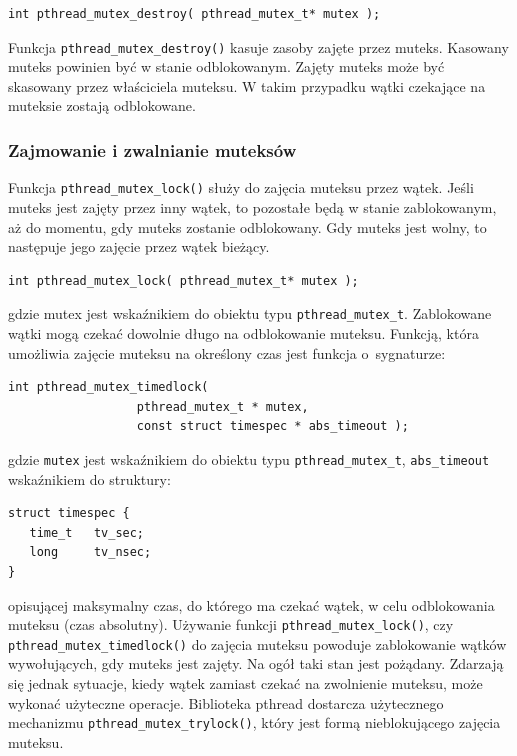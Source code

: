 \begin{lstlisting}[style=MyCStyle]
int pthread_mutex_destroy( pthread_mutex_t* mutex );
\end{lstlisting}

Funkcja \lstinline[style=MyCStyle]{pthread_mutex_destroy()} kasuje zasoby zajęte przez muteks. Kasowany muteks powinien być w stanie odblokowanym. Zajęty muteks może być skasowany przez właściciela muteksu. W takim przypadku wątki czekające na muteksie zostają odblokowane. 

\subsubsection{Zajmowanie i zwalnianie muteksów}

Funkcja  \lstinline[style=MyCStyle]{pthread_mutex_lock()} służy do zajęcia muteksu przez wątek. Jeśli muteks jest zajęty przez inny wątek, to pozostałe będą w stanie zablokowanym, aż do momentu, gdy muteks zostanie odblokowany. Gdy muteks jest wolny, to następuje jego zajęcie przez wątek bieżący.

\begin{lstlisting}[style=MyCStyle]
int pthread_mutex_lock( pthread_mutex_t* mutex );
\end{lstlisting}

gdzie mutex jest wskaźnikiem do obiektu typu \lstinline[style=MyCStyle]{pthread_mutex_t}. Zablokowane wątki mogą czekać dowolnie długo na odblokowanie muteksu. Funkcją, która umożliwia zajęcie muteksu na określony czas jest funkcja o~sygnaturze:

\begin{lstlisting}[style=MyCStyle]
int pthread_mutex_timedlock( 
                  pthread_mutex_t * mutex,
                  const struct timespec * abs_timeout );
\end{lstlisting}

gdzie \lstinline[style=MyCStyle]{mutex} jest wskaźnikiem do obiektu typu \lstinline[style=MyCStyle]{pthread_mutex_t}, \lstinline[style=MyCStyle]{abs_timeout} wskaźnikiem do struktury:

\begin{lstlisting}[style=MyCStyle]
struct timespec {
   time_t   tv_sec;
   long     tv_nsec;
}
\end{lstlisting}

opisującej maksymalny czas, do którego ma czekać wątek, w celu odblokowania muteksu (czas absolutny). 
Używanie funkcji \lstinline[style=MyCStyle]{pthread_mutex_lock()}, czy \lstinline[style=MyCStyle]{pthread_mutex_timedlock()} do zajęcia muteksu powoduje zablokowanie wątków wywołujących, gdy muteks jest zajęty. Na ogół taki stan jest pożądany. Zdarzają się jednak sytuacje, kiedy wątek zamiast czekać na zwolnienie muteksu, może wykonać użyteczne operacje. Biblioteka pthread dostarcza użytecznego mechanizmu \lstinline[style=MyCStyle]{pthread_mutex_trylock()}, który jest formą nieblokującego zajęcia muteksu.

